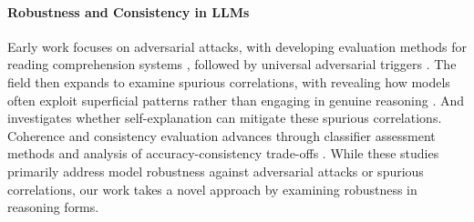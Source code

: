 \paragraph{Robustness and Consistency in LLMs} 
Early work focuses on adversarial attacks, with developing evaluation methods for reading comprehension systems \cite{jia2017adversarial}, followed by universal adversarial triggers \cite{wallace2019universal}. The field then expands to examine spurious correlations, with revealing how models often exploit superficial patterns rather than engaging in genuine reasoning \cite{branco2021shortcutted,geirhos2020shortcut}. And \citealp{ross2022does} investigates whether self-explanation can mitigate these spurious correlations. Coherence and consistency evaluation advances through classifier assessment methods \cite{storks2021beyond} and analysis of accuracy-consistency trade-offs \cite{johnson2023much}. While these studies primarily address model robustness against adversarial attacks or spurious correlations, our work takes a novel approach by examining robustness in reasoning forms.

% 
